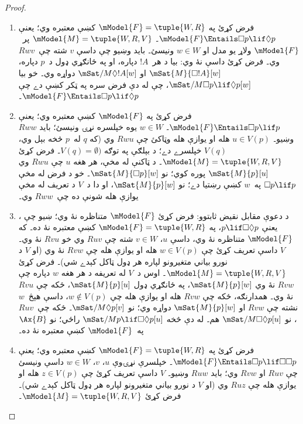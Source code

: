 \documentclass[../../../include/open-logic-section]{subfiles}
\begin{document}
\begin{proof}
  \begin{enumerate}
  \item فرض کړئ  په $\mModel{F} = \tuple{W, R}$ کښې معتبره
    وي؛ يعنې $\mModel{F} \Entails \Box p \lif \Diamond p$۔
    $\mModel{M} = \tuple{W, R, V}$ پر~$\mModel{F}$ ولاړ يو مدل
    او $w \in W$ ونيسئ۔ بايد وښيو چې داسې $v$ شته چې~$Rwv$ وي۔
    فرض کړئ داسې نۀ وي: بيا د هر~$!A$ دپاره، او په ځانګړي ډول د~$p$
    دپاره، $\mSat{M}{\Box !A}[w]$ او
    $\mSat/{M}{\Diamond !A}[w]$ دواړه وي۔ خو بيا
    $\mSat/{M}{\Box p \lif \Diamond p}[w]$، چې له دې فرض سره
    په ټکر کښې دے چې $\mModel{F} \Entails \Box p \lif \Diamond p$۔
  \item فرض کړئ  په $\mModel{F}$ کښې معتبره وي؛ يعنې
    $\mModel{F} \Entails \Box p \lif p$۔ $w \in W$ يوه خپلسره
    نړۍ ونيسئ؛ بايد $Rww$ وښيو۔ $u \in V(p)$ هله او يوازې هله
    وټاکئ چې $Rwu$ وي (که $q$ له~$p$ څخه بېل وي، $V(q)$ خپلسرے
    دے؛ د بېلګې په توګه $V(q) = \emptyset)$۔ فرض کړئ
    $\mModel{M} = \tuple{W, R, V}$۔ د ټاکنې له مخې، هر هغه $u$ چې
    $Rwu$ وي $\mSat{M}{p}[u]$ پوره کوي؛ نو
    $\mSat{M}{\Box p}[w]$۔ خو د فرض له مخې $\Box p \lif p$
    په~$w$ کښې رښتيا دے؛ نو $\mSat{M}{p}[w]$، او دا د~$V$ د
    تعريف له مخې يوازې هله شونې ده چې~$Rww$ وي۔
  \item د دعوې مقابل نقيض ثابتوو: فرض کړئ $\mModel{F}$ متناظره نۀ وي؛
    ښيو چې ، يعنې $p \lif \Box\Diamond p$، په
    $\mModel{F}= \tuple{W, R}$ کښې معتبره نۀ ده۔ که
    $\mModel{F}$ متناظره نۀ وي، داسې $u$، $v \in W$ شته چې
    $Ruv$ وي خو $Rvu$ نۀ وي۔ $V$ داسې تعريف کړئ چې
    $w \in V(p)$ هله او يوازې هله چې $Rvw$ نۀ وي (او $V$ د نورو بياني
    متغيرونو لپاره هر ډول ټاکل کېدے شي)۔ فرض کړئ $\mModel{M} =\tuple{W, R,
      V}$۔ اوس د~$V$ له تعريفه د هر هغه $w$ دپاره چې $Rvw$ نۀ
    وي $\mSat{M}{p}[w]$، په ځانګړي ډول $\mSat{M}{p}[u]$، ځکه
    چې $Rvu$ نۀ وي۔ همدارنګه، ځکه چې $Rvw$ هله او يوازې هله چې
    $w \notin V(p)$، داسې هېڅ~$w$ نشته چې $Rvw$ او
    $\mSat{M}{p}[w]$ دواړه وي؛ نو
    $\mSat/{M}{\Diamond p}[v]$۔ ځکه چې~$Ruv$، نو
    $\mSat/{M}{\Box\Diamond p}[u]$ هم۔ له دې څخه
    $\mSat/{M}{p \lif \Box\Diamond p}[u]$ راځي؛ نو $\Ax{B}$
    په~$\mModel{F}$ کښې معتبره نۀ ده۔
  \item فرض کړئ  په $\mModel{F} = \tuple{W,R}$ کښې معتبره
    وي؛ يعنې $\mModel{F} \Entails \Box p \lif \Box\Box p$۔
    خپلسرې نړۍوې $u$، $v$، $w \in W$ داسې ونيسئ چې $Ruv$ او
    $Rvw$ وي؛ بايد $Ruw$ وښيو۔ $V$ داسې تعريف کړئ چې
    $z \in V(p)$ هله او يوازې هله چې $Ruz$ وي (او $V$ د نورو بياني
    متغيرونو لپاره هر ډول ټاکل کېدے شي)۔ فرض کړئ $\mModel{M} =\tuple{W, R, V}$۔

\end{enumerate}
\end{proof}
\end{document}
